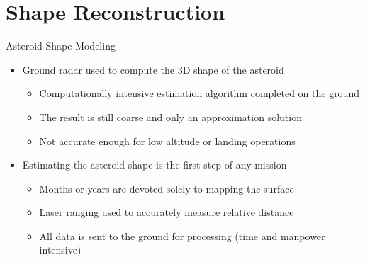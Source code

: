 
\section{Shape Reconstruction}
\begin{frame}{Asteroid Shape Modeling}
    \begin{itemize}
        \item<1-> Ground radar used to compute the 3D shape of the asteroid
        \begin{itemize}
            \item Computationally intensive estimation algorithm completed on the ground 
            \item The result is still coarse and only an approximation solution
            \item Not accurate enough for low altitude or landing operations
        \end{itemize}
    \item<2-> Estimating the asteroid shape is the first step of any mission
    \begin{itemize}
        \item Months or years are devoted solely to mapping the surface
        \item Laser ranging used to accurately measure relative distance 
        \item All data is sent to the ground for processing (time and manpower intensive)
    \end{itemize}
    \end{itemize}
    
\end{frame}

